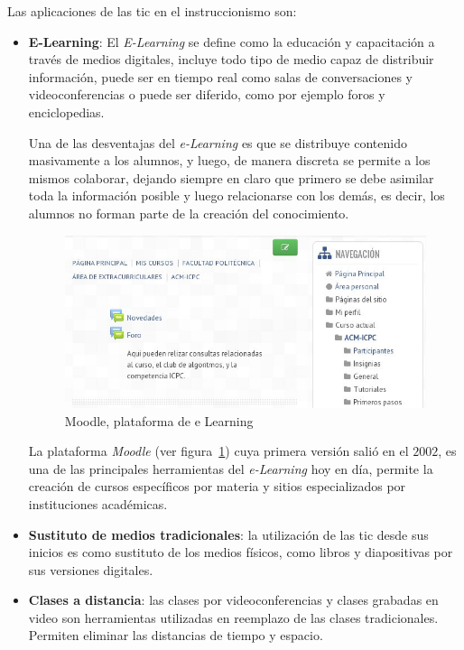Las aplicaciones de las \gls{tic} en el instruccionismo son:

\begin{itemize}

\item \textbf{E-Learning}: El \emph{E-Learning} se define como la educación y
    capacitación a través de medios digitales, incluye todo tipo de medio capaz
    de distribuir información, puede ser en tiempo real como salas de
    conversaciones y videoconferencias o puede ser diferido, como por ejemplo
    foros y enciclopedias\cite{punie:ict}.

    Una de las desventajas del \emph{e-Learning} es que se distribuye contenido
    masivamente a los alumnos, y luego, de manera discreta se permite a los
    mismos colaborar, dejando siempre en claro que primero se debe asimilar toda
    la información posible y luego relacionarse con los
    demás\cite{leinonen:ict}, es decir, los alumnos no forman parte de la
    creación del conocimiento.

    \begin{figure}[h] 
    \centering 
    \includegraphics[scale=0.5]{tics/images/moodle.jpg}
    \caption{Moodle, plataforma de e Learning}\label{fig:moodle}
    \end{figure}

    La plataforma \emph{Moodle} (ver figura~\ref{fig:moodle}) cuya primera
    versión salió en el $2002$, es una de las principales herramientas del
    \emph{e-Learning} hoy en día, permite la creación de cursos específicos por
    materia y sitios especializados por instituciones
    académicas\cite{perkins2006using}. 

\item \textbf{Sustituto de medios tradicionales}: la utilización de las
    \gls{tic} desde sus inicios es como sustituto de los medios físicos, como
    libros y diapositivas por sus versiones digitales\cite{tinio:ict}.

\item \textbf{Clases a distancia}: las clases por videoconferencias y clases
    grabadas en video son herramientas utilizadas en reemplazo de las clases
    tradicionales. Permiten eliminar las distancias de tiempo y
    espacio\cite{tinio:ict}.

\end{itemize}

